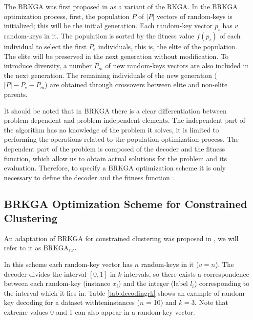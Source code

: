 The \acf{BRKGA} was first proposed in \cite{gonccalves2011biased} as a variant of the \acs{RKGA}. In the \acs{BRKGA} optimization process, first, the population $P$ of $|P|$ vectors of random-keys is initialized; this will be the initial generation. Each random-key vector $p_i$ has $v$ random-keys in it. The population is sorted by the fitness value $f(p_i)$ of each individual to select the first $P_e$ individuals, this is, the elite of the population. The elite will be preserved in the next generation without modification. To introduce diversity, a number $P_m$ of new random-keys vectors are also included in the next generation. The remaining individuals of the new generation ($|P| - P_e - P_m$) are obtained through crossovers between elite and non-elite parents.

It should be noted that in \acs{BRKGA} there is a clear differentiation between problem-dependent and problem-independent elements. The independent part of the algorithm has no knowledge of the problem it solves, it is limited to performing the operations related to the population optimization process. The dependent part of the problem is composed of the decoder and the fitness function, which allow us to obtain actual solutions for the problem and its evaluation. Therefore, to specify a \acs{BRKGA} optimization scheme it is only necessary to define the decoder and the fitness function \cite{gonccalves2011biased}.

\subsection[\acsfont{BRKGA} Optimization Scheme for Constrained Clustering]{BRKGA Optimization Scheme for Constrained Clustering} \label{sec:AdaptationofBRKGA}

An adaptation of \acs{BRKGA} for constrained clustering was proposed in \cite{de2017comparison}, we will refer to it as \acs{BRKGA}$_{CC}$.

In this scheme each random-key vector has $n$ random-keys in it ($v = n$). The decoder divides the interval $[0,1]$ in $k$ intervals, so there exists a correspondence between each random-key (instance $x_i$) and the integer (label $l_i$) corresponding to the interval which it lies in. Table \ref{tab:decodingrk} shows an example of random-key decoding for a dataset withteninstances ($n$ = 10) and $k = 3$. Note that extreme values 0 and 1 can also appear in a random-key vector.

